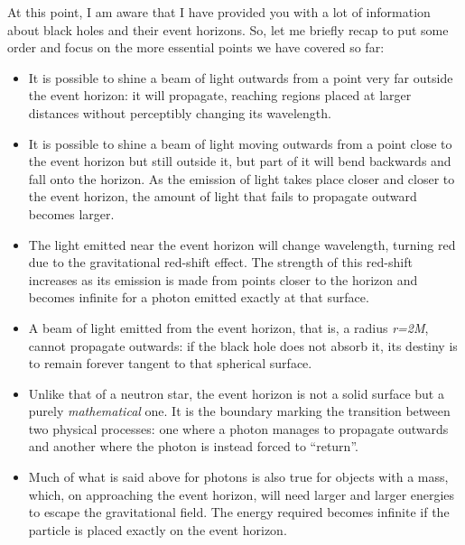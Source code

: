 At this point, I am aware that I have provided you with a lot of information about black
holes and their event horizons. So, let me briefly recap to put some
order and focus on the more essential points we have covered so far:

\begin{itemize}
\item It is possible to shine a beam of light outwards from a point very far outside the event
horizon: it will propagate, reaching regions placed at larger distances without
perceptibly changing its wavelength.

\item It is possible to shine a beam of light moving outwards from a point close to the event
horizon but still outside it, but part of it will bend backwards and fall onto the
horizon. As the emission of light takes place closer and closer to the event horizon,
the amount of light that fails to propagate outward becomes larger.

\item The light emitted near the event horizon will change wavelength, turning red due to the
gravitational red-shift effect. The strength of this red-shift
increases as its emission is made from points closer to the horizon and becomes infinite
for a photon emitted exactly at that surface.

\item A beam of light emitted from the event horizon, that is, a radius \emph{r=2M}, cannot
propagate outwards: if the black hole does not absorb it, its destiny is to remain
forever tangent to that spherical surface.

\item Unlike that of a neutron star, the event horizon is not a solid surface but a purely
\emph{mathematical} one. It is the boundary marking the transition between two physical
processes: one where a photon manages to propagate outwards and another where the
photon is instead forced to ``return''.

\item Much of what is said above for photons is also true for objects with a mass, which, on
approaching the event horizon, will need larger and larger energies to escape the
gravitational field. The energy required becomes infinite if the particle is placed
exactly on the event horizon.
\end{itemize}

